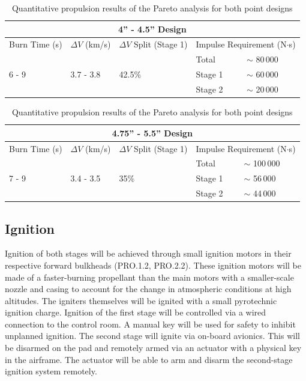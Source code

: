 \begin{table}
    \centering

    \begin{tabularx}{0.9\textwidth}{|p{2.5cm}|p{2cm}|p{3cm}|X|X|}
        \hline
        \multicolumn{5}{|c|}{\textbf{4'' - 4.5'' Design}} \\ \hline
        Burn Time (s) & \(\Delta V\) (km/s) & \(\Delta V\) Split (Stage 1) & \multicolumn{2}{|l|}{Impulse Requirement (N\(\cdot\)s)} \\ \hline
        \multirow{3}{*}{6 - 9} & \multirow{3}{*}{3.7 - 3.8} & \multirow{3}{*}{42.5\%} & Total & \(\sim\) 80\(\,\)000 \\ \cline{4-5}
        & & & Stage 1 & \(\sim\) 60\,000 \\ \cline{4-5}
        & & & Stage 2 & \(\sim\) 20\,000 \\ \hline        
    \end{tabularx}

    \vspace{0.75cm}

    \begin{tabularx}{0.9\textwidth}{|p{2.5cm}|p{2cm}|p{3cm}|X|X|}
        \hline
        \multicolumn{5}{|c|}{\textbf{4.75'' - 5.5'' Design}} \\ \hline
        Burn Time (s) & \(\Delta V\) (km/s) & \(\Delta V\) Split (Stage 1) & \multicolumn{2}{|l|}{Impulse Requirement (N\(\cdot\)s)} \\ \hline
        \multirow{3}{*}{7 - 9} & \multirow{3}{*}{3.4 - 3.5} & \multirow{3}{*}{35\%} & Total & \(\sim\) 100\(\,\)000 \\ \cline{4-5}
        & & & Stage 1 & \(\sim\) 56\,000 \\ \cline{4-5}
        & & & Stage 2 & \(\sim\) 44\,000 \\ \hline        
    \end{tabularx}

    \caption{Quantitative propulsion results of the Pareto analysis for both point designs}
    \label{table:prop-pareto-results}
\end{table}

\subsection{Ignition}
Ignition of both stages will be achieved through small ignition motors in their respective forward bulkheads (PRO.1.2, PRO.2.2). These ignition motors will be made of a faster-burning propellant than the main motors with a smaller-scale nozzle and casing to account for the change in atmospheric conditions at high altitudes. The igniters themselves will be ignited with a small pyrotechnic ignition charge.  Ignition of the first stage will be controlled via a wired connection to the control room. A manual key will be used for safety to inhibit unplanned ignition. The second stage will ignite via on-board avionics. This will be disarmed on the pad and remotely armed via an actuator with a physical key in the airframe. The actuator will be able to arm and disarm the second-stage ignition system remotely. 

